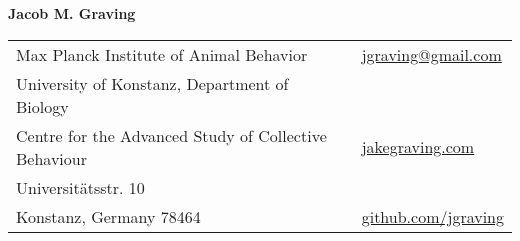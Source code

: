\documentclass[letterpaper,10pt,oneside]{article}
\begin{document}

\LARGE{\textbf{Jacob M. Graving}}  \\
\normalsize



\begin{center}
\begin{tabular}{l l}
 Max Planck Institute of Animal Behavior		& \hspace{2in} \href{mailto:jgraving@gmail.com}{\faEnvelope{ } jgraving@gmail.com} \\
 University of Konstanz, Department of Biology	\\ %
  Centre for the Advanced Study of Collective Behaviour    & \hspace{2in}  \href{http://jakegraving.com/}{\faGlobe{ } jakegraving.com}   \\
  Universit\"{a}tsstr. 10  & \hspace{2in}   \\
   Konstanz, Germany 78464         & \hspace{2in} \href{https://github.com/jgraving}{\faGithub{ }  github.com/jgraving} \\
 
\end{tabular}
\end{center}
\end{document}
